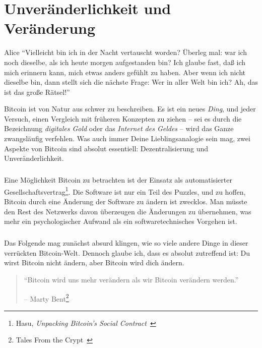 \chapter{Unveränderlichkeit und Veränderung}
\label{les:1}

\begin{chapquote}{Alice}
\enquote{Vielleicht bin ich in der Nacht vertauscht worden? Überleg mal: war ich
noch dieselbe, als ich heute morgen aufgestanden bin? Ich glaube fast, daß ich
mich erinnern kann, mich etwas anders gefühlt zu haben. Aber wenn ich nicht
dieselbe bin, dann stellt sich die nächste Frage: Wer in aller Welt bin ich? Ah,
das ist das große Rätsel!}
\end{chapquote}

Bitcoin ist von Natur aus schwer zu beschreiben. Es ist ein neues \textit{Ding},
und jeder Versuch, einen Vergleich mit früheren Konzepten zu ziehen – sei es
durch die Bezeichnung \textit{digitales Gold} oder das \textit{Internet des
Geldes} – wird das Ganze zwangsläufig verfehlen. Was auch immer Deine
Lieblingsanalogie sein mag, zwei Aspekte von Bitcoin sind absolut essentiell:
Dezentralisierung und Unveränderlichkeit.

\paragraph{}
Eine Möglichkeit Bitcoin zu betrachten ist der Einsatz als automatisierter
Gesellschaftsvertrag\footnote{Hasu, \textit{Unpacking Bitcoin's Social
Contract}~\cite{social-contract}}. Die Software ist nur ein Teil des Puzzles,
und zu hoffen, Bitcoin durch eine Änderung der Software zu ändern ist zwecklos.
Man müsste den Rest des Netzwerks davon überzeugen die Änderungen zu übernehmen,
was mehr ein psychologischer Aufwand als ein softwaretechnisches Vorgehen ist.

\paragraph{}
Das Folgende mag zunächst absurd klingen, wie so viele andere Dinge in dieser
verrückten Bitcoin-Welt. Dennoch glaube ich, dass es absolut zutreffend ist: Du
wirst Bitcoin nicht ändern, aber Bitcoin wird dich ändern.

\begin{quotation}\begin{samepage}
\enquote{Bitcoin wird uns mehr verändern als wir Bitcoin verändern werden.}
\begin{flushright} -- Marty Bent\footnote{Tales From the Crypt~\cite{tftc21}}
\end{flushright}\end{samepage}\end{quotation}

